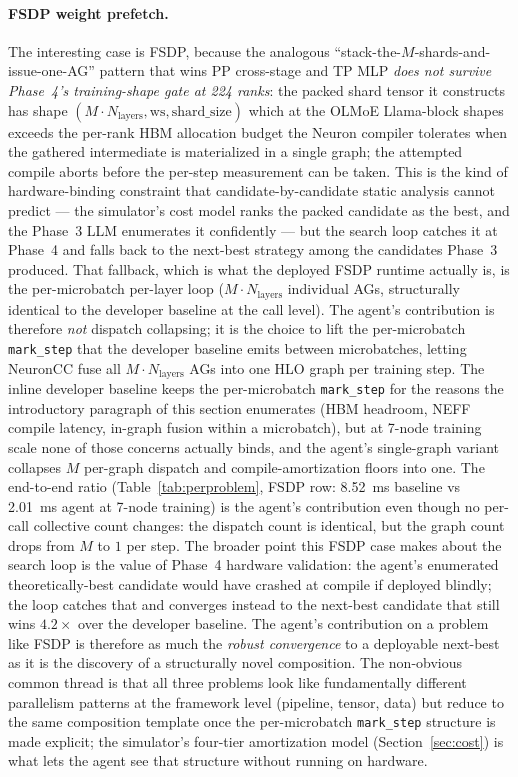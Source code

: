 \paragraph{FSDP weight prefetch.} The interesting case is FSDP,
because the analogous ``stack-the-$M$-shards-and-issue-one-AG''
pattern that wins PP cross-stage and TP MLP \emph{does not
survive Phase~4's training-shape gate at 224 ranks}: the packed
shard tensor it constructs has shape
$(M \cdot N_\text{layers}, \text{ws}, \text{shard\_size})$ which
at the OLMoE Llama-block shapes exceeds the per-rank HBM
allocation budget the Neuron compiler tolerates when the
gathered intermediate is materialized in a single graph; the
attempted compile aborts before the per-step measurement can be
taken. This is the kind of hardware-binding constraint that
candidate-by-candidate static analysis cannot predict --- the
simulator's cost model ranks the packed candidate as the best,
and the Phase~3 LLM enumerates it confidently --- but the search
loop catches it at Phase~4 and falls back to the next-best
strategy among the candidates Phase~3 produced. That fallback,
which is what the deployed FSDP runtime actually is, is the
per-microbatch per-layer loop ($M \cdot N_\text{layers}$
individual AGs, structurally identical to the developer baseline
at the call level). The agent's contribution is therefore
\emph{not} dispatch collapsing; it is the choice to lift the
per-microbatch \texttt{mark\_step} that the developer baseline
emits between microbatches, letting NeuronCC fuse all
$M \cdot N_\text{layers}$ AGs into one HLO graph per training
step. The inline developer baseline keeps the per-microbatch
\texttt{mark\_step} for the reasons the introductory paragraph
of this section enumerates (HBM headroom, NEFF compile latency,
in-graph fusion within a microbatch), but at 7-node training
scale none of those concerns actually binds, and the agent's
single-graph variant collapses $M$ per-graph dispatch and
compile-amortization floors into one. The end-to-end ratio
(Table~\ref{tab:perproblem}, FSDP row: 8.52~ms baseline vs
2.01~ms agent at 7-node training) is the agent's contribution
even though no per-call collective count changes: the dispatch
count is identical, but the graph count drops from $M$ to $1$
per step. The broader point this FSDP case makes about the
search loop is the value of Phase~4 hardware validation:
the agent's enumerated theoretically-best candidate would have
crashed at compile if deployed blindly; the loop catches that
and converges instead to the next-best candidate that still wins
$4.2\times$ over the developer baseline. The agent's contribution
on a problem like FSDP is therefore as much the
\emph{robust convergence} to a deployable next-best as it is the
discovery of a structurally novel composition. The non-obvious common thread is that all three
problems look like fundamentally different parallelism patterns at
the framework level (pipeline, tensor, data) but reduce to the same
composition template once the per-microbatch \texttt{mark\_step}
structure is made explicit; the simulator's four-tier amortization
model (Section~\ref{sec:cost}) is what lets the agent see that
structure without running on hardware.

\FloatBarrier

